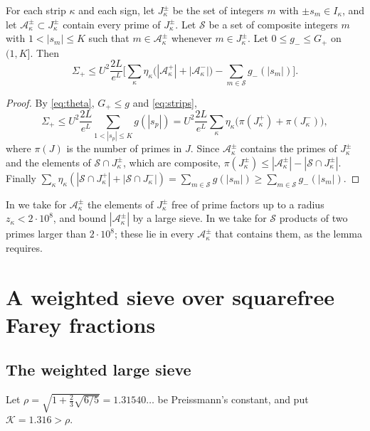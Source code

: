 \documentclass[11pt,colorlinks]{charlie}
\newcommand{\cA}{\mathcal A}
\newcommand{\cS}{\mathcal S}
\newcommand{\Ka}{\mathcal K}
\begin{document}
\begin{lemma}\label{lem:sigma-plus}
For each strip $\kappa$ and each sign, let $J_\kappa^\pm$ be the set of integers $m$ with $\pm s_m\in I_\kappa$, and let $\cA_\kappa^\pm\subset J_\kappa^\pm$ contain every prime of $J_\kappa^\pm$. Let $\cS$ be a set of composite integers $m$ with $1<|s_m|\le K$ such that $m\in\cA_\kappa^\pm$ whenever $m\in J_\kappa^\pm$. Let $0\le g_-\le G_+$ on $(1,K]$. Then
\[
 \Sigma_+\le U^2\frac{2L}{e^L}\Big[\sum_\kappa\eta_\kappa\big(|\cA_\kappa^+|+|\cA_\kappa^-|\big)-\sum_{m\in\cS}g_-(|s_m|)\Big].
\]
\end{lemma}
\begin{proof}
By \eqref{eq:theta}, $G_+\le g$ and \eqref{eq:strips},
\[
 \Sigma_+\le U^2\frac{2L}{e^L}\sum_{1<|s_p|\le K}g(|s_p|)=U^2\frac{2L}{e^L}\sum_\kappa\eta_\kappa\big(\pi(J_\kappa^+)+\pi(J_\kappa^-)\big),
\]
where $\pi(J)$ is the number of primes in $J$. Since $\cA_\kappa^\pm$ contains the primes of $J_\kappa^\pm$ and the elements of $\cS\cap J_\kappa^\pm$, which are composite, $\pi(J_\kappa^\pm)\le|\cA_\kappa^\pm|-|\cS\cap J_\kappa^\pm|$. Finally $\sum_\kappa\eta_\kappa(|\cS\cap J_\kappa^+|+|\cS\cap J_\kappa^-|)=\sum_{m\in\cS}g(|s_m|)\ge\sum_{m\in\cS}g_-(|s_m|)$.
\end{proof}

In  we take for $\cA_\kappa^\pm$ the elements of $J_\kappa^\pm$ free of prime factors up to a radius $z_\kappa<2\cdot10^8$, and bound $|\cA_\kappa^\pm|$ by a large sieve. In  we take for $\cS$ products of two primes larger than $2\cdot10^8$; these lie in every $\cA_\kappa^\pm$ that contains them, as the lemma requires.

\section{A weighted sieve over squarefree Farey fractions}\label{sec:sieve}

\subsection{The weighted large sieve}
Let $\rho=\sqrt{1+\frac23\sqrt{6/5}}=1.31540\ldots$ be Preissmann's constant, and put $\Ka=1.316>\rho$.
\end{document}
